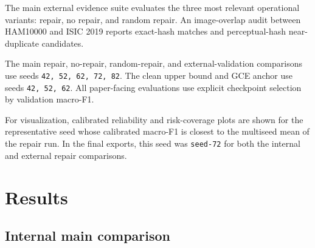 \documentclass[11pt]{article}
\begin{document}
The main external evidence suite evaluates the three most relevant operational variants: repair, no repair, and random repair. An image-overlap audit between HAM10000 and ISIC 2019 reports exact-hash matches and perceptual-hash near-duplicate candidates.

The main repair, no-repair, random-repair, and external-validation comparisons use seeds \texttt{42, 52, 62, 72, 82}. The clean upper bound and GCE anchor use seeds \texttt{42, 52, 62}. All paper-facing evaluations use explicit checkpoint selection by validation macro-F1.

For visualization, calibrated reliability and risk-coverage plots are shown for the representative seed whose calibrated macro-F1 is closest to the multiseed mean of the repair run. In the final exports, this seed was \texttt{seed-72} for both the internal and external repair comparisons.

\section{Results}

\subsection{Internal main comparison}

\begin{table}[ht]
\centering
{}
\caption{Corrected internal main comparison on HAM10000, reported as calibrated test metrics (mean $\pm$ std) across five seeds.}
\label{tab:internal-main}
\end{table}
\end{document}
